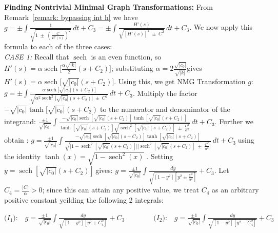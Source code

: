 \documentclass[12pt]{article}
\theoremstyle{plain}
\theoremstyle{definition}
\theoremstyle{remark}
\begin{document}
  \textbf{Finding Nontrivial Minimal Graph Transformations: } From Remark~\ref{remark: bypassing int h} we have \footnotesize\(g = \pm \displaystyle \int \tfrac{1}{\sqrt{1\; \pm\; \left(\frac{C}{H'(s)}\right)^2}}\, dt + C_3=\pm \displaystyle \int \tfrac{H'(s)}{\sqrt{[H'(s)]^2\; \pm\; C^2}}\, dt + C_3\)\normalsize. We now apply this formula to each of the three cases:\\

  \textit{CASE 1:} Recall that \(\operatorname{sech}\) is an even function, so \footnotesize\(H'(s)=\alpha\operatorname{sech}\!\big[\tfrac{\alpha \sqrt{|k|}}{2}(s+C_2)\big]\)\normalsize; substituting \footnotesize\(\alpha=2\tfrac{\sqrt{|c_0|}}{\sqrt{|k|}}\)\normalsize gives \footnotesize\(H'(s)=\alpha\operatorname{sech}\!\big[\sqrt{|c_0|}(s+C_2)\big]\)\normalsize. Using this, we get NMG Transformation \(g\): \footnotesize\(g =\pm \int \tfrac{\alpha\operatorname{sech}\!\big[\sqrt{|c_0|}(s+C_2)\big]}{\sqrt{\alpha^2\operatorname{sech}^2\!\big[\sqrt{|c_0|}(s+C_2)\big]\; \pm\; C^2}}\, dt + C_3\)\normalsize. Multiply the factor \footnotesize\(-\sqrt{|c_0|}\operatorname{tanh}\!\big[\sqrt{|c_0|}(s+C_2)\;\)\normalsize to the numerator and denominator of the integrand: \footnotesize\(\tfrac{\pm 1}{\sqrt{|c_0|}} \int \tfrac{-\sqrt{|c_0|}\operatorname{sech}[\sqrt{|c_0|}(s+C_2)]\operatorname{tanh}[\sqrt{|c_0|}(s+C_2)]}{\operatorname{tanh}[\sqrt{|c_0|}(s+C_2)]\sqrt{\operatorname{sech}^2[\sqrt{|c_0|}(s+C_2)]\; \pm\; \frac{C^2}{\alpha^2}}}\, dt + C_3\)\normalsize. Further we obtain : \footnotesize\(g=\tfrac{\pm 1}{\sqrt{|c_0|}} \int \tfrac{-\sqrt{|c_0|}\operatorname{sech}[\sqrt{|c_0|}(s+C_2)]\operatorname{tanh}[\sqrt{|c_0|}(s+C_2)]}{\sqrt{\big[1-\operatorname{sech}^2[\sqrt{|c_0|}(s+C_2)]\big]\big[\operatorname{sech}^2[\sqrt{|c_0|}(s+C_2)]\; \pm\; \tfrac{C^2}{\alpha^2}\big]}}\, dt + C_3\;\)\normalsize using the identity \footnotesize\(\tanh(x)=\sqrt{1-\operatorname{sech}^2(x)}\;\)\normalsize. Setting \footnotesize\(y=\operatorname{sech}[\sqrt{|c_0|}(s+C_2)]\,\)\normalsize gives: \footnotesize\(g=\tfrac{\pm 1}{\sqrt{|c_0|}} \int \tfrac{dy}{\sqrt{[1-y^2][y^2 \pm \frac{C^2}{\alpha^2}]}} + C_3\)\normalsize. Let \(C_4=\tfrac{|C|}{\alpha}>0\); since this can attain any positive value,  we treat \(C_4\) as an arbitrary positive constant yeilding the following 2 integrals:
  
  \footnotesize\(
  \big(I_1\big):\;\;\; g=\tfrac{\pm 1}{\sqrt{|c_0|}} \displaystyle \int \tfrac{dy}{\sqrt{[1-y^2][y^2 + C_4^2]}} + C_3\qquad\qquad \big(I_2\big):\;\;\; g=\tfrac{\pm 1}{\sqrt{|c_0|}} \displaystyle \int \tfrac{dy}{\sqrt{[1-y^2][y^2 - C_4^2]}} + C_3
  \)\normalsize
\end{document}
